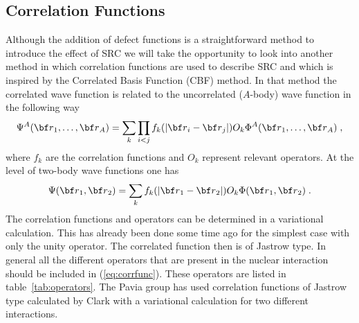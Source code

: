 
\subsection{Correlation Functions\label{sec:cf}}
Although the addition of defect functions is a straightforward method to 
introduce
the effect of SRC we will take the opportunity to look into another method
in  which correlation functions are used
to describe SRC and which is inspired by the Correlated Basis 
Function (CBF) method.
 In that method the correlated wave
function is related to the uncorrelated ($A$-body) wave function in the 
following way%
\cite{GP94,Ja55,FP88,BFF94}
%
	\begin{equation}
		\Psi^A(\rvec{r}_1,\ldots,\rvec{r}_A)
	=
		\sum_k
		\prod_{i<j}
		f_k(|\rvec{r}_i-\rvec{r}_j|)
		O_k
		\Phi^A(\rvec{r}_1,\ldots,\rvec{r}_A) 
	\label{eq:corrfunctotal}
	\;,
	\end{equation}
%
where $f_k$ are the correlation functions and $O_k$ represent relevant 
operators.
At the level of two-body wave functions one has
%
	\begin{equation}
		\Psi(\rvec{r}_1,\rvec{r}_2)
	=
		\sum_k
		f_k(|\rvec{r}_1-\rvec{r}_2|)
		O_k\Phi(\rvec{r}_1,\rvec{r}_2) 
	\label{eq:corrfunc}
	\;.
	\end{equation}
%
The correlation functions and operators can be determined in a variational
calculation. This has already been done some time
ago for the simplest case\cite{Cl81}
 with only the unity operator. 
The correlated function then is of Jastrow type\cite{Ja55}. 
In general all the 
different operators
that are present in the nuclear interaction should be included in 
(\ref{eq:corrfunc})\cite{FP88}. 
These operators are listed in table~\ref{tab:operators}.
The Pavia group\cite{GP94} has used
correlation functions of Jastrow type
calculated by Clark\cite{Cl81} with a 
variational calculation for two different interactions.

